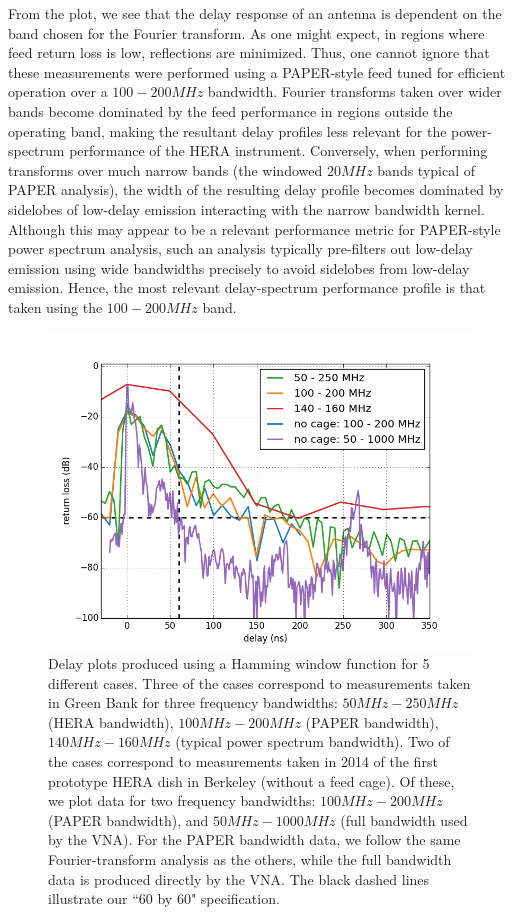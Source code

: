 \documentclass[12pt,preprint]{aastex}
\begin{document}
From the plot, we see that the delay response of an antenna is dependent on the band chosen for the Fourier transform.  As one might expect, in regions
where feed return loss is low, reflections are minimized.  Thus, one cannot ignore that these measurements were performed
using a PAPER-style feed tuned for efficient operation over a $100-200MHz$ bandwidth.  Fourier transforms taken over wider bands
become dominated by the feed performance in regions outside the operating band, making the resultant delay profiles less relevant
for the power-spectrum performance of the HERA instrument.  Conversely, when performing transforms over much 
narrow bands (the windowed $20MHz$ bands typical of PAPER analysis), the width of the resulting delay profile
becomes dominated by sidelobes of low-delay emission interacting with the narrow bandwidth kernel.  
Although this may appear to be a relevant performance metric
for PAPER-style power spectrum analysis, such an analysis typically pre-filters out low-delay emission using wide bandwidths precisely to avoid
sidelobes from low-delay emission.  Hence, the most relevant delay-spectrum performance profile is that taken using the $100-200MHz$ band.

\begin{figure}[H]
\centering
\includegraphics[totalheight=0.4\textheight]{plots/delay3_window.png}
\caption{Delay plots produced using a Hamming window function for 5 different cases. Three of the cases correspond to measurements taken in Green Bank for three frequency bandwidths: $50MHz-250MHz$ (HERA bandwidth), $100MHz-200MHz$ (PAPER bandwidth), $140MHz-160MHz$ (typical power spectrum bandwidth). Two of the cases correspond to measurements taken in 2014 of the first prototype HERA dish in Berkeley (without a feed cage). Of these, we plot data for two frequency bandwidths: $100MHz-200MHz$ (PAPER bandwidth), and $50MHz-1000MHz$ (full bandwidth used by the VNA). For the PAPER bandwidth data, we follow the same Fourier-transform analysis as the others, while the full bandwidth data is produced directly by the VNA. The black dashed lines illustrate our ``60 by 60" specification.}
\label{fig:3bands}
\end{figure} 
\end{document}
